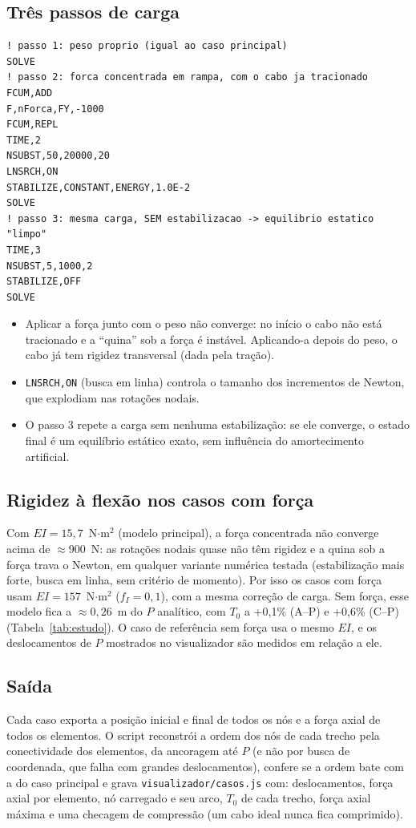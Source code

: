 \documentclass[11pt,a4paper]{article}
\begin{document}
\subsection{Três passos de carga}
\begin{lstlisting}[language=APDL]
! passo 1: peso proprio (igual ao caso principal)
SOLVE
! passo 2: forca concentrada em rampa, com o cabo ja tracionado
FCUM,ADD
F,nForca,FY,-1000
FCUM,REPL
TIME,2
NSUBST,50,20000,20
LNSRCH,ON
STABILIZE,CONSTANT,ENERGY,1.0E-2
SOLVE
! passo 3: mesma carga, SEM estabilizacao -> equilibrio estatico "limpo"
TIME,3
NSUBST,5,1000,2
STABILIZE,OFF
SOLVE
\end{lstlisting}
\begin{itemize}[itemsep=2pt]
  \item Aplicar a força junto com o peso não converge: no início o cabo não está tracionado e a
        ``quina'' sob a força é instável. Aplicando-a depois do peso, o cabo já tem rigidez
        transversal (dada pela tração).
  \item \texttt{LNSRCH,ON} (busca em linha) controla o tamanho dos incrementos de Newton, que
        explodiam nas rotações nodais.
  \item O passo 3 repete a carga sem nenhuma estabilização: se ele converge, o estado final é um
        equilíbrio estático exato, sem influência do amortecimento artificial.
\end{itemize}

\subsection{Rigidez à flexão nos casos com força}
Com $EI=15{,}7$~N$\cdot$m$^2$ (modelo principal), a força concentrada não converge acima de
$\approx 900$~N: as rotações nodais quase não têm rigidez e a quina sob a força trava o Newton, em
qualquer variante numérica testada (estabilização mais forte, busca em linha, sem critério de
momento). Por isso os casos com força usam $EI=157$~N$\cdot$m$^2$ ($f_I=0{,}1$), com a mesma
correção de carga. Sem força, esse modelo fica a $\approx 0{,}26$~m do $P$ analítico, com $T_0$ a
+0,1\% (A--P) e +0,6\% (C--P) (Tabela~\ref{tab:estudo}). O caso de referência sem força usa o mesmo
$EI$, e os deslocamentos de $P$ mostrados no visualizador são medidos em relação a ele.

\subsection{Saída}
Cada caso exporta a posição inicial e final de todos os nós e a força axial de todos os elementos.
O script reconstrói a ordem dos nós de cada trecho pela conectividade dos elementos, da ancoragem até
$P$ (e não por busca de coordenada, que falha com grandes deslocamentos), confere se a ordem bate com
a do caso principal e grava \texttt{visualizador/casos.js} com: deslocamentos, força axial por
elemento, nó carregado e seu arco, $T_0$ de cada trecho, força axial máxima e uma checagem de
compressão (um cabo ideal nunca fica comprimido).
\end{document}
